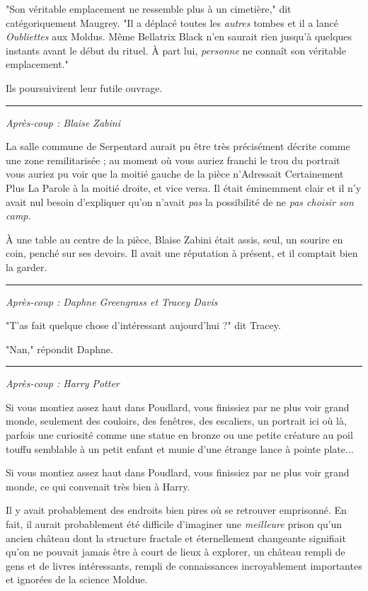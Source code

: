 "Son véritable emplacement ne ressemble plus à un cimetière," dit catégoriquement Maugrey. "Il a déplacé toutes les \emph{autres}  tombes et il a lancé \emph{Oubliettes}  aux Moldus. Même Bellatrix Black n'en saurait rien jusqu'à quelques instants avant le début du rituel. À part lui, \emph{personne}  ne connaît son véritable emplacement."

Ils poursuivirent leur futile ouvrage.
\par\noindent\rule{\textwidth}{0.4pt}
\emph{Après-coup : Blaise Zabini} 

La salle commune de Serpentard aurait pu être très précisément décrite comme une zone remilitarisée ; au moment où vous auriez franchi le trou du portrait vous auriez pu voir que la moitié gauche de la pièce n'Adressait Certainement Plus La Parole à la moitié droite, et vice versa. Il était éminemment clair et il n'y avait nul besoin d'expliquer qu'on n'avait \emph{pas}  la possibilité de ne \emph{pas choisir son camp.} 

À une table au centre de la pièce, Blaise Zabini était assis, seul, un sourire en coin, penché sur ses devoirs. Il avait une réputation à présent, et il comptait bien la garder.
\par\noindent\rule{\textwidth}{0.4pt}
\emph{Après-coup : Daphne Greengrass et Tracey Davis} 

"T'as fait quelque chose d'intéressant aujourd'hui ?" dit Tracey.

"Nan," répondit Daphne.
\par\noindent\rule{\textwidth}{0.4pt}
\emph{Après-coup : Harry Potter} 

Si vous montiez assez haut dans Poudlard, vous finissiez par ne plus voir grand monde, seulement des couloirs, des fenêtres, des escaliers, un portrait ici où là, parfois une curiosité comme une statue en bronze ou une petite créature au poil touffu semblable à un petit enfant et munie d'une étrange lance à pointe plate...

Si vous montiez assez haut dans Poudlard, vous finissiez par ne plus voir grand monde, ce qui convenait très bien à Harry.

Il y avait probablement des endroits bien pires où se retrouver emprisonné. En fait, il aurait probablement été difficile d'imaginer une \emph{meilleure}  prison qu'un ancien château dont la structure fractale et éternellement changeante signifiait qu'on ne pouvait jamais être à court de lieux à explorer, un château rempli de gens et de livres intéressants, rempli de connaissances incroyablement importantes et ignorées de la science Moldue.

